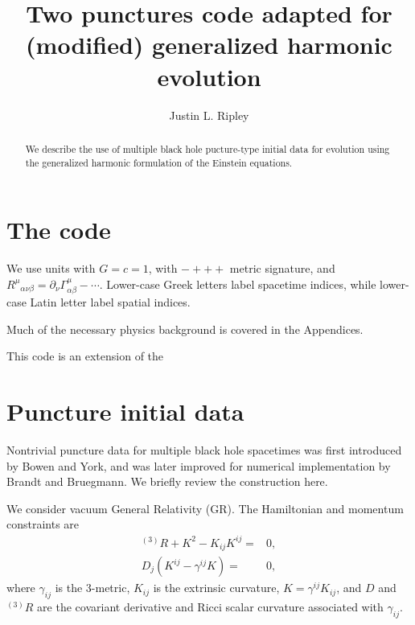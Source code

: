 \documentclass[%
notitlepage,
report,
nofootinbib,
 amsmath,amssymb,
 aps,
]{revtex4-1}
\newcommand{\ssec}[1]{\section{#1}}
\begin{document}
\title{Two punctures code adapted for (modified) generalized harmonic evolution}
\author{Justin L. Ripley}
%
\begin{abstract}
   We describe the use of multiple black hole pucture-type initial data
   for evolution using the generalized harmonic formulation of the
   Einstein equations.
\end{abstract}
\maketitle
\ssec{The code}%
We use units with $G=c=1$, with $-+++$ metric signature, and
$R^{\mu}{}_{\alpha\nu\beta}=\partial_{\nu}\Gamma^{\mu}_{\alpha\beta}-\cdots$.
Lower-case Greek letters label spacetime indices, while lower-case
Latin letter label spatial indices.

Much of the necessary physics background is covered in the Appendices.

This code is an extension of the \
\appendix
\ssec{Puncture initial data}%
Nontrivial puncture data for multiple black hole spacetimes was first
introduced by Bowen and York\cite{Bowen:1980yu}, and was later
improved for numerical implementation by
Brandt and Bruegmann\cite{Brandt:1997tf}.
We briefly review the construction here.

We consider vacuum General Relativity (GR). The Hamiltonian and
momentum constraints are
\begin{subequations}
\begin{align}
   {}^{(3)}R+K^2-K_{ij}K^{ij} 
   =&
   0
   ,\\
   D_j\left(K^{ij}-\gamma^{ij}K\right)
   =&
   0
   ,
\end{align}
\end{subequations}
where $\gamma_{ij}$ is the 3-metric, $K_{ij}$ is the extrinsic curvature,
$K=\gamma^{ij}K_{ij}$, and $D$ and ${}^{(3)}R$ are the covariant derivative
and Ricci scalar curvature associated with $\gamma_{ij}$.
\end{document}
